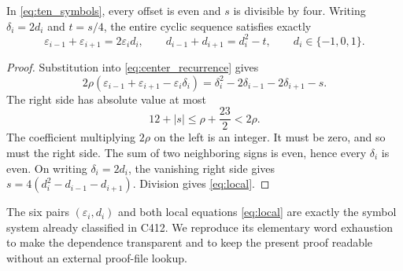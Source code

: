 \begin{lemma}
\label{lem:separation}
In \eqref{eq:ten_symbols}, every offset is even and $s$ is divisible
by four. Writing $\delta_i=2d_i$ and $t=s/4$, the entire cyclic
sequence satisfies exactly
\begin{equation}
 \varepsilon_{i-1}+\varepsilon_{i+1}=2\varepsilon_i d_i,
 \qquad d_{i-1}+d_{i+1}=d_i^2-t,
 \qquad d_i\in\{-1,0,1\}.
 \label{eq:local}
\end{equation}
\end{lemma}
\begin{proof}
Substitution into \eqref{eq:center_recurrence} gives
\begin{equation}
 2\rho(\varepsilon_{i-1}+\varepsilon_{i+1}
              -\varepsilon_i\delta_i)
 =\delta_i^2-2\delta_{i-1}-2\delta_{i+1}-s.
 \label{eq:separation}
\end{equation}
The right side has absolute value at most
\[
 12+|s|\le\rho+\frac{23}{2}<2\rho.
\]
The coefficient multiplying $2\rho$ on the left is an integer.
It must be zero, and so must the right side. The sum of two
neighboring signs is even, hence every $\delta_i$ is even.
On writing $\delta_i=2d_i$, the vanishing right side gives
$s=4(d_i^2-d_{i-1}-d_{i+1})$. Division gives
\eqref{eq:local}.
\end{proof}

The six pairs $(\varepsilon_i,d_i)$ and both local equations
\eqref{eq:local} are exactly the symbol system already classified
in C412. We reproduce its elementary word exhaustion to make the
dependence transparent and to keep the present proof readable
without an external proof-file lookup.
